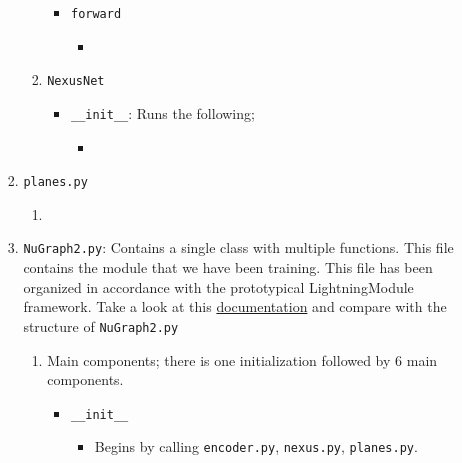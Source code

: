 \begin{itemize}
\begin{enumerate}
\begin{enumerate}
\begin{enumerate}
\begin{itemize}
                                    \item \texttt{forward}
                                        \begin{itemize}
                                            \item 
                                        \end{itemize}
                                \end{itemize}

                            \item \texttt{NexusNet}
                                \begin{itemize} 
                                    \item \texttt{\_\_init\_\_}: Runs the following;
                                        \begin{itemize}
                                            \item \texttt{}
                                        \end{itemize}
                                \end{itemize}
                        \end{enumerate}

                    \item \texttt{planes.py}
                        \begin{enumerate}
                            \item
                        \end{enumerate}

                    \item \texttt{NuGraph2.py}: Contains a single class with multiple functions. This file contains the module that we have been training. This file has been organized in accordance with the prototypical LightningModule framework. Take a look at this \href{https://lightning.ai/docs/pytorch/stable/common/lightning_module.html}{\color{blue} documentation} and compare with the structure of \texttt{NuGraph2.py}
                        \begin{enumerate}
                            \item Main components; there is one initialization followed by 6 main components.
                            \begin{itemize}
                                \item \texttt{\_\_init\_\_}
                                \begin{itemize}
                                    \item Begins by calling \texttt{encoder.py}, \texttt{nexus.py}, \texttt{planes.py}.


\end{itemize}
\end{itemize}
\end{enumerate}
\end{enumerate}
\end{enumerate}
\end{itemize}
